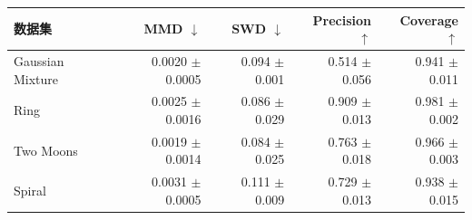 \begin{tabular}{lrrrr}
\toprule
数据集 & MMD $\downarrow$ & SWD $\downarrow$ & Precision $\uparrow$ & Coverage $\uparrow$ \\
\midrule
Gaussian Mixture & 0.0020 $\pm$ 0.0005 & 0.094 $\pm$ 0.001 & 0.514 $\pm$ 0.056 & 0.941 $\pm$ 0.011 \\
Ring & 0.0025 $\pm$ 0.0016 & 0.086 $\pm$ 0.029 & 0.909 $\pm$ 0.013 & 0.981 $\pm$ 0.002 \\
Two Moons & 0.0019 $\pm$ 0.0014 & 0.084 $\pm$ 0.025 & 0.763 $\pm$ 0.018 & 0.966 $\pm$ 0.003 \\
Spiral & 0.0031 $\pm$ 0.0005 & 0.111 $\pm$ 0.009 & 0.729 $\pm$ 0.013 & 0.938 $\pm$ 0.015 \\
\bottomrule
\end{tabular}